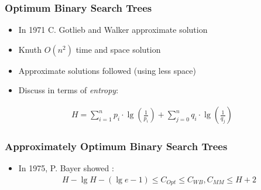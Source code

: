 \documentclass{beamer}
\theoremstyle{plain}
\begin{document}
\begin{frame} \frametitle{Optimum Binary Search Trees}

\begin{itemize}
\item In 1971 C. Gotlieb and Walker approximate solution \cite{walker1971top}

\item Knuth $O(n^2)$ time and space solution \cite{knuth1971optimum}

\item Approximate solutions followed (using less space)

\item Discuss in terms of \textit{entropy}:
\end{itemize}

\begin{align*}
H = \sum_{i=1}^{n} p_i\cdot\lg \left(\frac{1}{p_i} \right) + \sum_{j=0}^{n} q_i\cdot\lg \left( \frac{1}{q_j} \right)
\end{align*}

\end{frame}

\begin{frame} \frametitle{Approximately Optimum Binary Search Trees}


\begin{itemize}
\item In 1975, P. Bayer showed \cite{bayer1975improved}:
\begin{align*}
H-\lg H-(\lg e-1) \leq C_{Opt} \leq C_{WB}, C_{MM} \leq H + 2
\end{align*}

\end{itemize}
\end{frame}
\end{document}
